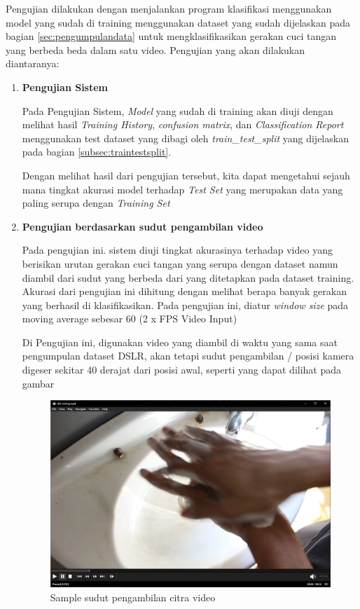 Pengujian dilakukan dengan menjalankan program klasifikasi menggunakan model yang sudah di training menggunakan dataset yang sudah dijelaskan pada bagian \ref{sec:pengumpulandata} untuk mengklasifikasikan gerakan cuci tangan yang berbeda beda dalam satu video. Pengujian yang akan dilakukan diantaranya:
\begin{enumerate}
	\item \textbf{Pengujian Sistem}

	Pada Pengujian Sistem, \textit{Model} yang sudah di training akan diuji dengan melihat hasil \textit{Training History}, \textit{confusion matrix}, dan \textit{Classification Report} menggunakan test dataset yang dibagi oleh \textit{train\_test\_split} yang dijelaskan pada bagian \ref{subsec:traintestsplit}.
	
	Dengan melihat hasil dari pengujian tersebut, kita dapat mengetahui sejauh mana tingkat akurasi model terhadap \textit{Test Set} yang merupakan data yang paling serupa dengan \textit{Training Set}
	
	\item \textbf{Pengujian berdasarkan sudut pengambilan video}

	Pada pengujian ini. sistem diuji tingkat akurasinya terhadap video yang berisikan urutan gerakan cuci tangan yang serupa dengan dataset namun diambil dari sudut yang berbeda dari yang ditetapkan pada dataset training. Akurasi dari pengujian ini dihitung dengan melihat berapa banyak gerakan yang berhasil di klasifikasikan. Pada pengujian ini, diatur \textit{window size} pada moving average sebesar 60 (2 x FPS Video Input)
	
	Di Pengujian ini, digunakan video yang diambil di waktu yang sama saat pengumpulan dataset DSLR, akan tetapi sudut pengambilan / posisi kamera digeser sekitar 40 derajat dari posisi awal, seperti yang dapat dilihat pada gambar
	
	\begin{figure}[!ht]
		\centering
		\includegraphics[width=0.6\columnwidth]{gambar/contohsudut.png}
		\caption{Sample sudut pengambilan citra video}
		\label{fig:contohsudut}
	\end{figure}
	

\end{enumerate}
